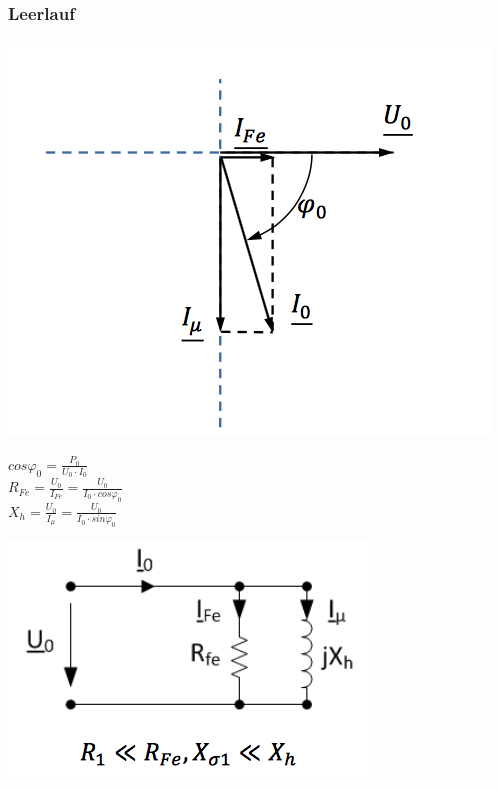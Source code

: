 \subsubsection{Leerlauf}
\begin{minipage}{0.3 \linewidth}
\includegraphics[width = \linewidth]{./Pics/VL1213/ZeigerdiagrammLeer}
\end{minipage}
\begin{minipage}{0.4 \linewidth}
$cos \varphi_0 = \frac{P_0}{U_0 \cdot I_0}$ \\

$R_{Fe} = \frac{U_0}{I_{Fe}} = \frac{U_0}{I_0 \cdot cos\varphi_0}$ \\

$X_h = \frac{U_0}{I_\mu} = \frac{U_0}{I_0 \cdot sin\varphi_0}$\\
\end{minipage}
\begin{minipage}{0.3 \linewidth}
\includegraphics[width = \linewidth]{./Pics/VL1213/Leerlauf}
\end{minipage}

